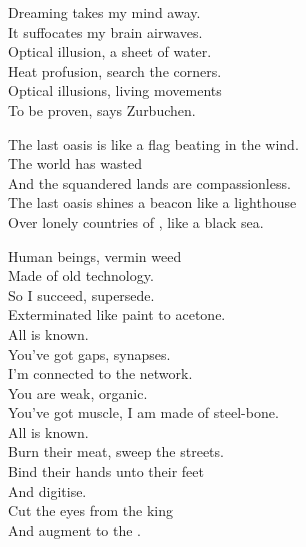 
Dreaming takes my mind away. \\
It suffocates my brain airwaves. \\

Optical illusion, a sheet of water. \\
Heat profusion, search the corners. \\

Optical illusions, living movements \\
To be proven, says Zurbuchen. \\


The last oasis is like a flag beating in the wind. \\
The world has wasted \\
And the squandered lands are compassionless. \\
The last oasis shines a beacon like a lighthouse \\
Over lonely countries of , like a black sea. \\





Human beings, vermin weed \\
Made of old technology. \\
So I succeed, supersede. \\
Exterminated like paint to acetone. \\

All is known. \\

You've got gaps, synapses. \\
I'm connected to the network. \\
You are weak, organic. \\
You've got muscle, I am made of steel-bone. \\

All is known. \\

Burn their meat, sweep the streets. \\
Bind their hands unto their feet \\
And digitise. \\
Cut the eyes from the king \\
And augment to the . \\

